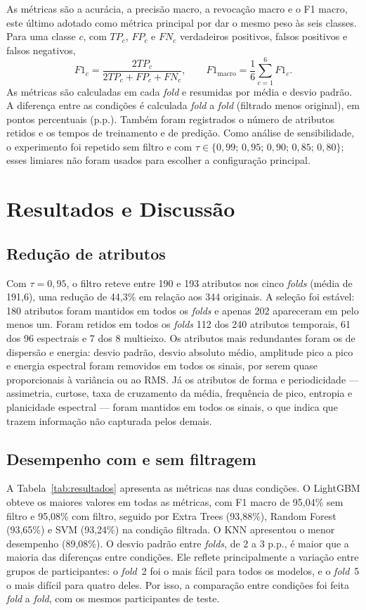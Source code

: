 \documentclass[conference]{IEEEtran}
\begin{document}
As métricas são a acurácia, a precisão macro, a revocação macro e o F1 macro, este último adotado como métrica principal por dar o mesmo peso às seis classes. Para uma classe $c$, com $TP_c$, $FP_c$ e $FN_c$ verdadeiros positivos, falsos positivos e falsos negativos,
\begin{equation}
F1_c=\frac{2TP_c}{2TP_c+FP_c+FN_c},\qquad F1_{\mathrm{macro}}=\frac{1}{6}\sum_{c=1}^{6}F1_c.
\label{eq:f1}
\end{equation}
As métricas são calculadas em cada \textit{fold} e resumidas por média e desvio padrão. A diferença entre as condições é calculada \textit{fold} a \textit{fold} (filtrado menos original), em pontos percentuais (p.p.). Também foram registrados o número de atributos retidos e os tempos de treinamento e de predição. Como análise de sensibilidade, o experimento foi repetido sem filtro e com $\tau\in\{0{,}99;\,0{,}95;\,0{,}90;\,0{,}85;\,0{,}80\}$; esses limiares não foram usados para escolher a configuração principal.

\section{Resultados e Discussão}
\label{sec:resultados}

\subsection{Redução de atributos}
Com $\tau=0{,}95$, o filtro reteve entre 190 e 193 atributos nos cinco \textit{folds} (média de 191,6), uma redução de 44,3\% em relação aos 344 originais. A seleção foi estável: 180 atributos foram mantidos em todos os \textit{folds} e apenas 202 apareceram em pelo menos um. Foram retidos em todos os \textit{folds} 112 dos 240 atributos temporais, 61 dos 96 espectrais e 7 dos 8 multieixo. Os atributos mais redundantes foram os de dispersão e energia: desvio padrão, desvio absoluto médio, amplitude pico a pico e energia espectral foram removidos em todos os sinais, por serem quase proporcionais à variância ou ao RMS. Já os atributos de forma e periodicidade --- assimetria, curtose, taxa de cruzamento da média, frequência de pico, entropia e planicidade espectral --- foram mantidos em todos os sinais, o que indica que trazem informação não capturada pelos demais.

\subsection{Desempenho com e sem filtragem}
A Tabela~\ref{tab:resultados} apresenta as métricas nas duas condições. O LightGBM obteve os maiores valores em todas as métricas, com F1 macro de 95,04\% sem filtro e 95,08\% com filtro, seguido por Extra Trees (93,88\%), Random Forest (93,65\%) e SVM (93,24\%) na condição filtrada. O KNN apresentou o menor desempenho (89,08\%). O desvio padrão entre \textit{folds}, de 2 a 3 p.p., é maior que a maioria das diferenças entre condições. Ele reflete principalmente a variação entre grupos de participantes: o \textit{fold}~2 foi o mais fácil para todos os modelos, e o \textit{fold}~5 o mais difícil para quatro deles. Por isso, a comparação entre condições foi feita \textit{fold} a \textit{fold}, com os mesmos participantes de teste.
\end{document}
